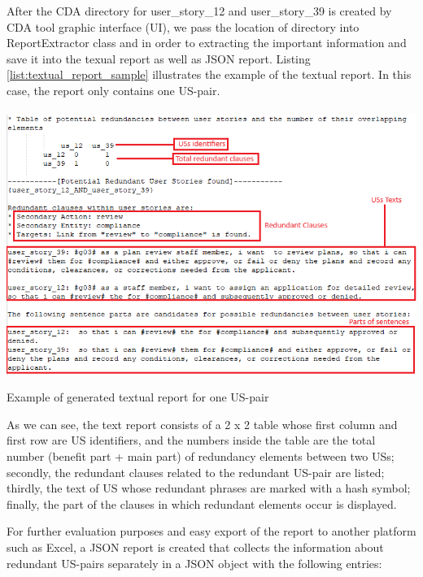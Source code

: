 \begin{example}
	After the CDA directory for user\_story\_12 and user\_story\_39 is created by CDA tool graphic interface (UI), we pass the location of directory into ReportExtractor class and in order to extracting the important information and save it into the texual report as well as JSON report.
	Listing \ref{list:textual_report_sample} illustrates the example of the textual report. In this case, the report only contains one US-pair.
	\begin{MyListing}
		\paragraph{}
		\centering
		\includegraphics[scale=0.7]{Listing/TextualReportSample.png}
		\caption{Example of generated textual report for one US-pair}\label{list:textual_report_sample}
	\end{MyListing}	
	As we can see, the text report consists of a 2 x 2 table whose first column and first row are US identifiers, and the numbers inside the table are the total number (benefit part + main part) of redundancy elements between two USs; secondly, the redundant clauses related to the redundant US-pair are listed; thirdly, the text of US whose redundant phrases are marked with a hash symbol; finally, the part of the clauses in which redundant elements occur is displayed.	
\end{example}
For further evaluation purposes and easy export of the report to another platform such as Excel, a JSON report is created that collects the information about redundant US-pairs separately in a JSON object with the following entries:
